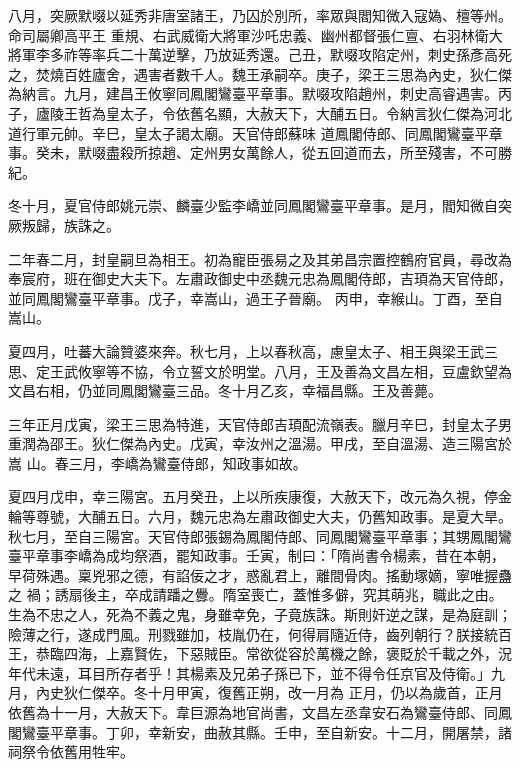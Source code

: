 \begin{pinyinscope}
 八月，突厥默啜以延秀非唐室諸王，乃囚於別所，率眾與閻知微入寇媯、檀等州。命司屬卿高平王
 重規、右武威衛大將軍沙吒忠義、幽州都督張仁亶、右羽林衛大將軍李多祚等率兵二十萬逆擊，乃放延秀還。己丑，默啜攻陷定州，刺史孫彥高死之，焚燒百姓廬舍，遇害者數千人。魏王承嗣卒。庚子，梁王三思為內史，狄仁傑為納言。九月，建昌王攸寧同鳳閣鸞臺平章事。默啜攻陷趙州，刺史高睿遇害。丙子，廬陵王哲為皇太子，令依舊名顯，大赦天下，大酺五日。令納言狄仁傑為河北道行軍元帥。辛巳，皇太子謁太廟。天官侍郎蘇味
 道鳳閣侍郎、同鳳閣鸞臺平章事。癸未，默啜盡殺所掠趙、定州男女萬餘人，從五回道而去，所至殘害，不可勝紀。



 冬十月，夏官侍郎姚元崇、麟臺少監李嶠並同鳳閣鸞臺平章事。是月，閻知微自突厥叛歸，族誅之。



 二年春二月，封皇嗣旦為相王。初為寵臣張易之及其弟昌宗置控鶴府官員，尋改為奉宸府，班在御史大夫下。左肅政御史中丞魏元忠為鳳閣侍郎，吉頊為天官侍郎，並同鳳閣鸞臺平章事。戊子，幸嵩山，過王子晉廟。
 丙申，幸緱山。丁酉，至自嵩山。



 夏四月，吐蕃大論贊婆來奔。秋七月，上以春秋高，慮皇太子、相王與梁王武三思、定王武攸寧等不協，令立誓文於明堂。八月，王及善為文昌左相，豆盧欽望為文昌右相，仍並同鳳閣鸞臺三品。冬十月乙亥，幸福昌縣。王及善薨。



 三年正月戊寅，梁王三思為特進，天官侍郎吉頊配流嶺表。臘月辛巳，封皇太子男重潤為邵王。狄仁傑為內史。戊寅，幸汝州之溫湯。甲戌，至自溫湯、造三陽宮於嵩
 山。春三月，李嶠為鸞臺侍郎，知政事如故。



 夏四月戊申，幸三陽宮。五月癸丑，上以所疾康復，大赦天下，改元為久視，停金輪等尊號，大酺五日。六月，魏元忠為左肅政御史大夫，仍舊知政事。是夏大旱。秋七月，至自三陽宮。天官侍郎張錫為鳳閣侍郎、同鳳閣鸞臺平章事；其甥鳳閣鸞臺平章事李嶠為成均祭酒，罷知政事。壬寅，制曰：「隋尚書令楊素，昔在本朝，早荷殊遇。稟兇邪之德，有諂佞之才，惑亂君上，離間骨肉。搖動塚嫡，寧唯握蠱之
 禍；誘扇後主，卒成請蹯之釁。隋室喪亡，蓋惟多僻，究其萌兆，職此之由。生為不忠之人，死為不義之鬼，身雖幸免，子竟族誅。斯則奸逆之謀，是為庭訓；險薄之行，遂成門風。刑戮雖加，枝胤仍在，何得肩隨近侍，齒列朝行？朕接統百王，恭臨四海，上嘉賢佐，下惡賊臣。常欲從容於萬機之餘，褒貶於千載之外，況年代未遠，耳目所存者乎！其楊素及兄弟子孫已下，並不得令任京官及侍衛。」九月，內史狄仁傑卒。冬十月甲寅，復舊正朔，改一月為
 正月，仍以為歲首，正月依舊為十一月，大赦天下。韋巨源為地官尚書，文昌左丞韋安石為鸞臺侍郎、同鳳閣鸞臺平章事。丁卯，幸新安，曲赦其縣。壬申，至自新安。十二月，開屠禁，諸祠祭令依舊用牲牢。




\end{pinyinscope}
